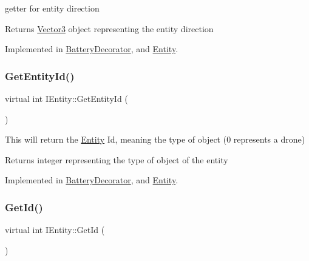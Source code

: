 getter for entity direction 

\begin{DoxyReturn}{Returns}
\hyperlink{classVector3}{Vector3} object representing the entity direction 
\end{DoxyReturn}


Implemented in \hyperlink{classBatteryDecorator_a8487174df54456fe29406927f0542720}{Battery\+Decorator}, and \hyperlink{classEntity_aae3890ab5d3d17ef4f805e735890f077}{Entity}.

\mbox{\label{classIEntity_a4359ee47413fa0b2940b3b0336e13861}} 
\subsubsection{\texorpdfstring{Get\+Entity\+Id()}{GetEntityId()}}
{\footnotesize\ttfamily virtual int I\+Entity\+::\+Get\+Entity\+Id (\begin{DoxyParamCaption}{ }\end{DoxyParamCaption})\hspace{0.3cm}{\ttfamily [pure virtual]}}



This will return the \hyperlink{classEntity}{Entity} Id, meaning the type of object (0 represents a drone) 

\begin{DoxyReturn}{Returns}
integer representing the type of object of the entity 
\end{DoxyReturn}


Implemented in \hyperlink{classBatteryDecorator_a38fb935ea609ef4e38ebb50e70200a43}{Battery\+Decorator}, and \hyperlink{classEntity_afd77b9faebc188849705d91c239d193c}{Entity}.

\mbox{\label{classIEntity_ac3d60cc2fab1ccb61c1be92373e636d9}} 
\subsubsection{\texorpdfstring{Get\+Id()}{GetId()}}
{\footnotesize\ttfamily virtual int I\+Entity\+::\+Get\+Id (\begin{DoxyParamCaption}{ }\end{DoxyParamCaption})\hspace{0.3cm}{\ttfamily [pure virtual]}}



